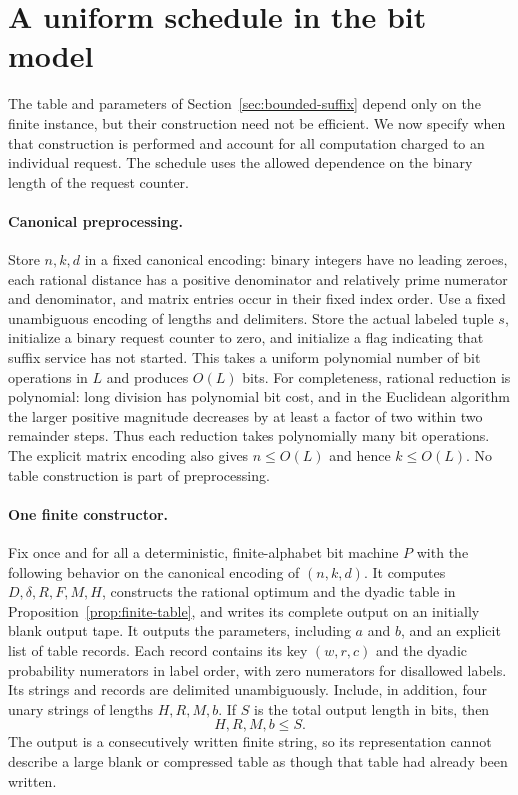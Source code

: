 \section{A uniform schedule in the bit model}
\label{sec:uniform-computation}

The table and parameters of Section~\ref{sec:bounded-suffix} depend only on
the finite instance, but their construction need not be efficient.  We now
specify when that construction is performed and account for all computation
charged to an individual request.  The schedule uses the allowed dependence
on the binary length of the request counter.

\paragraph{Canonical preprocessing.}
Store $n,k,d$ in a fixed canonical encoding: binary integers have no leading
zeroes, each rational distance has a positive denominator and relatively
prime numerator and denominator, and matrix entries occur in their fixed
index order.  Use a fixed unambiguous encoding of lengths and delimiters.
Store the actual labeled tuple $s$, initialize a binary request counter to
zero, and initialize a flag indicating that suffix service has not started.
This takes a uniform polynomial number of bit operations in $L$ and produces
$O(L)$ bits.  For completeness, rational reduction is polynomial: long
division has polynomial bit cost, and in the Euclidean algorithm the larger
positive magnitude decreases by at least a factor of two within two
remainder steps.  Thus each reduction takes polynomially many bit
operations.  The explicit matrix encoding also gives $n\le O(L)$ and hence
$k\le O(L)$.  No table construction is part of preprocessing.

\paragraph{One finite constructor.}
Fix once and for all a deterministic, finite-alphabet bit machine $P$ with
the following behavior on the canonical encoding of $(n,k,d)$.  It computes
$D,\delta,R,F,M,H$, constructs the rational optimum and the dyadic table in
Proposition~\ref{prop:finite-table}, and writes its complete output on an
initially blank output tape.  It outputs the parameters, including $a$ and
$b$, and an explicit list of table records.  Each record contains its key
$(w,r,c)$ and the dyadic probability numerators in label order, with zero
numerators for disallowed labels.  Its strings and records are delimited
unambiguously.  Include, in addition, four unary strings of lengths
$H,R,M,b$.  If $S$ is the total output length in bits, then
\begin{equation}
 H,R,M,b\le S.
 \label{eq:unary-size}
\end{equation}
The output is a consecutively written finite string, so its representation
cannot describe a large blank or compressed table as though that table had
already been written.

